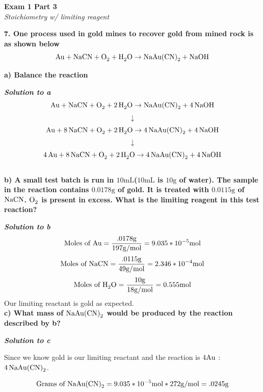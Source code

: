 \documentclass{article}
\begin{document}
    \pagebreak

    \begin{center}
        \textbf{Exam 1 Part 3}\\
        \textit{Stoichiometry w/ limiting reagent}
    \end{center}
    \textbf{7. One process used in gold mines to recover gold from mined rock is as shown below}
    $$  \ce{Au} +  \ce{NaCN} +   \ce{O_{2}} +  \ce{H_{2}O} \rightarrow  \ce{NaAu(CN)_{2}} +  \ce{NaOH}$$

    \textbf{a) Balance the reaction}

    \textbf{\textit{Solution to a}}
    $$  \ce{Au} +  \ce{NaCN} +   \ce{O_{2}} +  \ce{2H_{2}O} \rightarrow  \ce{NaAu(CN)_{2}} +  \ce{4NaOH}$$
    $$\downarrow $$
    $$  \ce{Au} +  \ce{8NaCN} +   \ce{O_{2}} +  \ce{2H_{2}O} \rightarrow  \ce{4NaAu(CN)_{2}} +  \ce{4NaOH}$$
    $$\downarrow $$
    $$  \ce{4Au} +  \ce{8NaCN} +   \ce{O_{2}} +  \ce{2H_{2}O} \rightarrow  \ce{4NaAu(CN)_{2}} +  \ce{4NaOH}$$\\[1cm]

    \textbf{b) A small test batch is run in $10 \si{\milli\liter}$($10 \si{\milli\liter}$ is $10 \si{\gram}$ of water). The sample in the reaction contains $0.0178 \si{\gram}$ of gold. It is treated with $0.0115 \si{\gram}$ of $\ce{NaCN}$. $\ce{O_{2}}$ is present in excess. What is the limiting reagent in this test reaction?}

    \textbf{\textit{Solution to b}}
    $$\text{Moles of \ce{Au}} = \dfrac{.0178 \si{\gram}}{197 \si[per-mode=symbol]{\gram\per\mol}} = 9.035 * 10^{-5} \si{\mole}$$
    $$ \text{Moles of \ce{NaCN}} = \dfrac{.0115 \si{\gram}}{49 \si[per-mode=symbol]{\gram\per\mol}} = 2.346 * 10^{-4} \si{\mole}$$
    $$ \text{Moles of \ce{H2O}} = \dfrac{10 \si{\gram}}{18 \si[per-mode=symbol]{\gram\per\mol}} = 0.555 \si{\mole}$$
    Our limiting reactant is gold as expected.\\[1cm]

    \textbf{c) What mass of $\ce{NaAu(CN)_{2}}$ would be produced by the    reaction described by b?}

    \textbf{\textit{Solution to c}}

    Since we know gold is our limiting reactant and the reaction is $\ce{4 Au}$ : $\ce{4NaAu(CN)2}$.

    $$ \text{Grams of \ce{NaAu(CN)2}} = 9.035 * 10^{-5} \si{\mole} * 272 \si[per-mode=symbol]{\gram\per\mol} = .0245  \si{\gram}$$
\end{document}
